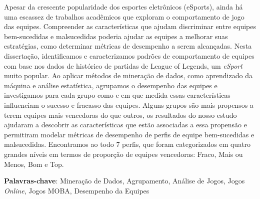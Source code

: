 Apesar da crescente popularidade dos esportes eletrônicos (eSports), ainda há uma escassez de trabalhos acadêmicos que exploram o comportamento de jogo das equipes. Compreender as características que ajudam discriminar entre equipes bem-sucedidas e malsucedidas poderia ajudar as equipes a melhorar suas estratégias, como determinar métricas de desempenho a serem alcançadas. Nesta dissertação, identificamos e caracterizamos padrões de comportamento de equipes com base nos dados de histórico de partidas de League of Legends, um \textit{eSport} muito popular. Ao aplicar métodos de mineração de dados, como aprendizado da máquina e análise estatística, agrupamos o desempenho das equipes e investigamos para cada grupo como e em que medida essas características influenciam o sucesso e fracasso das equipes. Alguns grupos s\~ao mais propensos a terem equipes mais vencedoras do que outros, os resultados do nosso estudo ajudaram a descobrir as caracter\'isticas que est\~ao associadas a essa propens\~ao e permitiram modelar métricas de desempenho de perfis de equipe bem-sucedidas e malsucedidas. Encontramos ao todo 7 perfis, que foram categorizados em quatro grandes níveis em termos de proporção de equipes vencedoras: Fraco, Mais ou Menos, Bom e Top.

\textbf{Palavras-chave}: Mineração de Dados, Agrupamento, Análise de Jogos, Jogos \textit{Online}, Jogos MOBA, Desempenho da Equipes